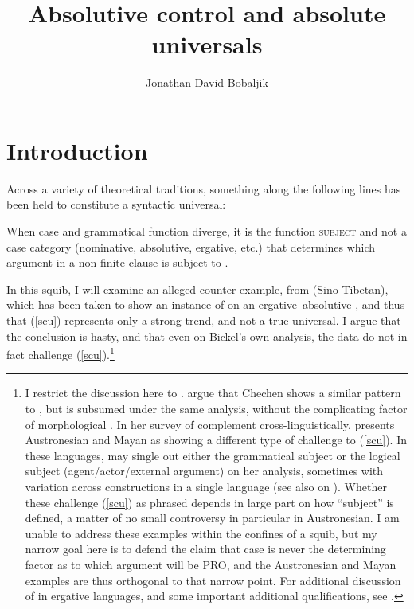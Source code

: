 \documentclass[output=paper]{langsci/langscibook}
\author{Jonathan David Bobaljik\affiliation{Harvard University}}
\title{Absolutive control and absolute universals}
\begin{document}
\glsresetall
\maketitle

\section{Introduction}

Across a variety of theoretical traditions, something along the following lines
has been held to constitute a syntactic universal:

\ea \label{scu} When case and grammatical function diverge, it is the function
\textsc{subject} and not a case category (nominative, absolutive, ergative, etc.)
that determines which argument in a non-finite clause is subject to .
\z

In this squib, I will examine an alleged counter-example, from 
(Sino-Tibetan), which has been taken \citep{bicknich01,malchukov14} to show an
instance of  on an ergative--absolutive , and thus that
(\ref{scu}) represents only a strong trend, and not a true universal. I argue
that the conclusion is hasty, and that even on Bickel's own analysis, the data
do not in fact challenge (\ref{scu}).\footnote{I restrict the discussion here
    to . \citet{bicknich01} argue that Chechen shows a similar pattern
    to , but is subsumed under the same analysis, without the
    complicating factor of morphological . In her survey of complement
     cross-linguistically, \citet{stiebels07} presents Austronesian and
    Mayan as showing a different type of challenge to (\ref{scu}).  In these
    languages,  may single out either the grammatical subject or the
    logical subject (agent/actor/external argument) on her analysis,  sometimes
    with variation across constructions in a single language (see also
    \citealp{Kroeger:1993,wurmbrand13tag} on ).  Whether these challenge
    (\ref{scu}) as phrased depends in large part on how \enquote{subject} is
    defined, a matter of no small controversy in particular in Austronesian. I
    am unable to address these examples within the confines of a squib, but my
    narrow goal here is to defend the claim that case is never the determining
    factor as to which argument will be PRO, and the Austronesian and Mayan
    examples are thus orthogonal to that narrow point. For additional
discussion of  in ergative languages, and some important additional
qualifications, see \citet[104--109]{polinsky16}.}
\end{document}
